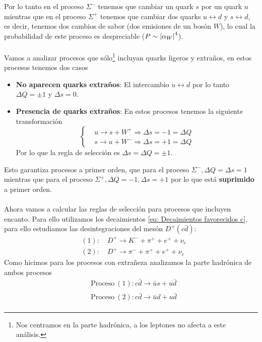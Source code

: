 Por lo tanto en el proceso $\Sigma^-$ tenemos que cambiar un quark $s$ por un quark $u$ mientras que en el proceso $\Sigma^+$ tenemos que cambiar dos quarks $u\leftrightarrow d$ y $s \leftrightarrow d$, es decir, tenemos dos cambios de sabor (dos emisiones de un bosón $W$), lo cual la probabilidad de este proceso es despreciable ($P\sim \abs{\alpha_W}^4$).\\\\
Vamos a analizar procesos que sólo\footnote{Nos centramos en la parte hadrónica, a los leptones no afecta a este análisis.} incluyan quarks ligeros y extraños, en estos procesos tenemos dos casos
\begin{itemize}
    \item \textbf{No aparecen quarks extraños}: El intercambio $u\leftrightarrow d$ por lo tanto $\Delta Q=\pm 1$ y $\Delta s=0$.
    \item \textbf{Presencia de quarks extraños}: En estos procesos tenemos la siguiente transformación $$\left \{ \begin{aligned}
        &u\xrightarrow{} s+W^+ \Rightarrow \Delta s =-1=\Delta Q\\
        &s\xrightarrow{} u+W^- \Rightarrow \Delta s =+1=\Delta Q
    \end{aligned} \right.$$
    Por lo que la regla de selección es $\Delta s=\Delta Q=\pm 1$. 
\end{itemize}

Esto garantiza procesos a primer orden, que para el proceso $\Sigma^-, \Delta Q=\Delta s=1$ mientras que para el proceso $\Sigma^+, \Delta Q=-1, \Delta s=+1$ por lo que está \textbf{suprimido} a primer orden.\\\\
Ahora vamos a calcular las reglas de selección para procesos que incluyen encanto. Para ello utilizamos los decaimientos \ref{eq: Decaimientos favorecidos c}, para ello estudiamos las desintegraciones del mesón $D^+(c\bar{d})$:
\begin{equation*}
    \begin{aligned}
        &(1): \quad D^+ \longrightarrow K^-+\pi^++e^++\nu_e \\
        &(2): \quad D^+ \longrightarrow \pi^-+\pi^++e^++\nu_e
    \end{aligned}
\end{equation*}
Como hicimos para los procesos con extrañeza analizamos la parte hadrónica de ambos procesos
\begin{equation*}
    \begin{aligned}
        &\text{Proceso} \ (1): c\bar{d}\xrightarrow[]{} \bar{u}s+u\bar{d}\\
        &\text{Proceso} \ (2):c\bar{d}\xrightarrow[]{} \bar{u}d+u\bar{d}
    \end{aligned}
\end{equation*}

